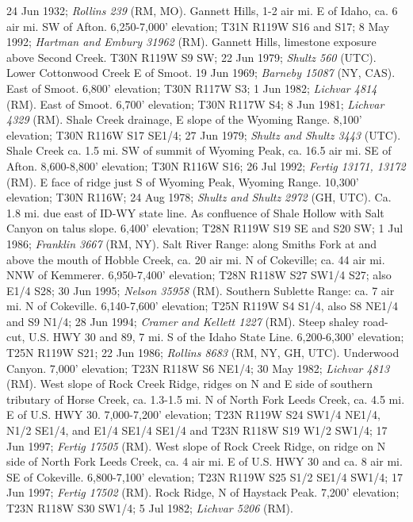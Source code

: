24 Jun 1932; \textit{Rollins 239} (RM, MO).
Gannett Hills, 1-2 air mi. E of Idaho, ca. 6 air mi. SW of Afton.
6,250-7,000' elevation; T31N R119W S16 and S17; 8 May 1992;
\textit{Hartman and Embury 31962} (RM).
Gannett Hills, limestone exposure above Second Creek. T30N R119W S9 SW;
22 Jun 1979; \textit{Shultz 560} (UTC).
Lower Cottonwood Creek E of Smoot. 19 Jun 1969;
\textit{Barneby 15087} (NY, CAS).
East of Smoot. 6,800' elevation; T30N R117W S3; 1 Jun 1982;
\textit{Lichvar 4814} (RM).
East of Smoot. 6,700' elevation; T30N R117W S4; 8 Jun 1981;
\textit{Lichvar 4329} (RM).
Shale Creek drainage, E slope of the Wyoming Range. 8,100' elevation;
T30N R116W S17 SE1/4; 27 Jun 1979; \textit{Shultz and Shultz 3443} (UTC).
Shale Creek ca. 1.5 mi. SW of summit of Wyoming Peak, ca. 16.5 air mi. SE of
Afton. 8,600-8,800' elevation; T30N R116W S16; 26 Jul 1992;
\textit{Fertig 13171, 13172} (RM).
E face of ridge just S of Wyoming Peak, Wyoming Range. 10,300' elevation;
T30N R116W; 24 Aug 1978; \textit{Shultz and Shultz 2972} (GH, UTC).
Ca. 1.8 mi. due east of ID-WY state line. As confluence of Shale Hollow with
Salt Canyon on talus slope. 6,400' elevation; T28N R119W S19 SE and S20 SW;
1 Jul 1986; \textit{Franklin 3667} (RM, NY).
Salt River Range: along Smiths Fork at and above the mouth of Hobble Creek,
ca. 20 air mi. N of Cokeville; ca. 44 air mi. NNW of Kemmerer.
6,950-7,400' elevation; T28N R118W S27 SW1/4 S27; also E1/4 S28; 30 Jun 1995;
\textit{Nelson 35958} (RM).
Southern Sublette Range: ca. 7 air mi. N of Cokeville. 6,140-7,600' elevation;
T25N R119W S4 S1/4, also S8 NE1/4 and S9 N1/4; 28 Jun 1994;
\textit{Cramer and Kellett 1227} (RM).
Steep shaley road-cut, U.S. HWY 30 and 89, 7 mi. S of the Idaho State Line.
6,200-6,300' elevation; T25N R119W S21; 22 Jun 1986;
\textit{Rollins 8683} (RM, NY, GH, UTC).
Underwood Canyon. 7,000' elevation; T23N R118W S6 NE1/4; 30 May 1982;
\textit{Lichvar 4813} (RM).
West slope of Rock Creek Ridge, ridges on N and E side of southern tributary of
Horse Creek, ca. 1.3-1.5 mi. N of North Fork Leeds Creek, ca. 4.5 mi. E of U.S.
HWY 30. 7,000-7,200' elevation; T23N R119W S24 SW1/4 NE1/4, N1/2 SE1/4,
and E1/4 SE1/4 SE1/4 and T23N R118W S19 W1/2 SW1/4; 17 Jun 1997;
\textit{Fertig 17505} (RM).
West slope of Rock Creek Ridge, on ridge on N side of North Fork Leeds Creek,
ca. 4 air mi. E of U.S. HWY 30 and ca. 8 air mi. SE of Cokeville.
6,800-7,100' elevation; T23N R119W S25 S1/2 SE1/4 SW1/4; 17 Jun 1997;
\textit{Fertig 17502} (RM).
Rock Ridge, N of Haystack Peak. 7,200' elevation; T23N R118W S30 SW1/4;
5 Jul 1982; \textit{Lichvar 5206} (RM).
